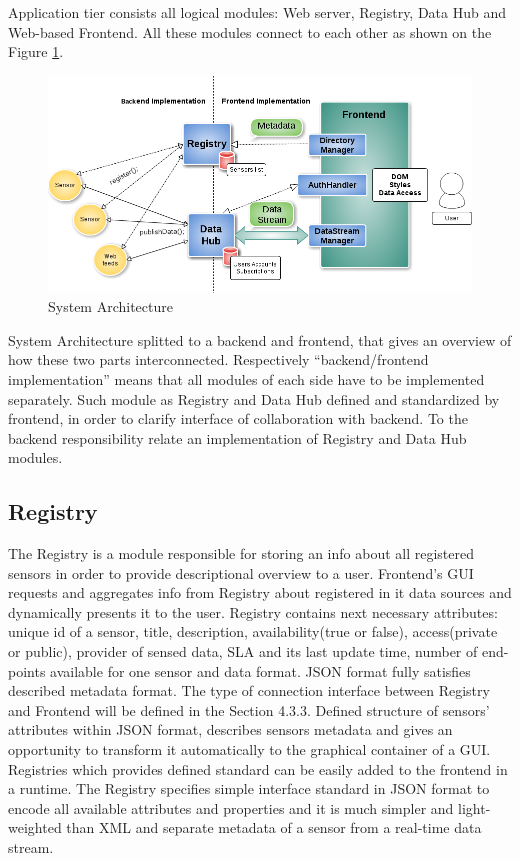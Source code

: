   Application tier consists all logical modules: Web server, Registry, Data Hub and Web-based Frontend. All these modules connect to each other as shown on the Figure \ref{img:structure}. 
    \begin{figure}[!ht]
    \centering
    \includegraphics[scale=0.6]{images/Structure.png}   
    \caption[System Architecture]{System Architecture} 
    \label{img:structure}                        
    \end{figure}

    System Architecture splitted to a backend and frontend, that gives an overview of how these two parts interconnected. Respectively ``backend/frontend implementation'' means that all modules of each side have to be implemented separately. Such module as Registry and Data Hub defined and standardized by frontend, in order to clarify interface of collaboration with backend. To the backend responsibility relate an implementation of Registry and Data Hub modules.

  \subsection{Registry}
    The Registry is a module responsible for storing an info about all registered sensors in order to provide descriptional overview to a user. Frontend's GUI requests and aggregates info from Registry about registered in it data sources and dynamically presents it to the user. Registry contains next necessary attributes: unique id of a sensor, title, description, availability(true or false), access(private or public), provider of sensed data, SLA and its last update time, number of end-points available for one sensor and data format. JSON format fully satisfies described metadata format. The type of connection interface between Registry and Frontend will be defined in the Section 4.3.3. Defined structure of sensors' attributes within JSON format, describes sensors metadata and gives an opportunity to transform it automatically to the graphical container of a GUI. Registries which provides defined standard can be easily added to the frontend in a runtime. The Registry specifies simple interface standard in JSON format to encode all available attributes and properties and it is much simpler and light-weighted than XML and separate metadata of a sensor from a real-time data stream. 

